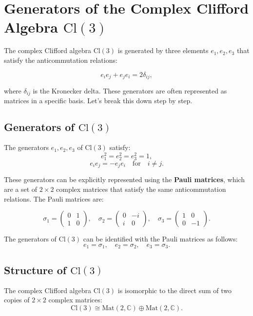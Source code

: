 \documentclass{article}
\begin{document}
\section*{Generators of the Complex Clifford Algebra \( \text{Cl}(3) \)}

The complex Clifford algebra \( \text{Cl}(3) \) is generated by three elements \( e_1, e_2, e_3 \) that satisfy the anticommutation relations:

\[
e_i e_j + e_j e_i = 2 \delta_{ij},
\]

where \( \delta_{ij} \) is the Kronecker delta. These generators are often represented as matrices in a specific basis. Let's break this down step by step.

\subsection*{Generators of \( \text{Cl}(3) \)}
The generators \( e_1, e_2, e_3 \) of \( \text{Cl}(3) \) satisfy:
\[
e_1^2 = e_2^2 = e_3^2 = 1,
\]
\[
e_i e_j = -e_j e_i \quad \text{for} \quad i \neq j.
\]

These generators can be explicitly represented using the \textbf{Pauli matrices}, which are a set of \( 2 \times 2 \) complex matrices that satisfy the same anticommutation relations. The Pauli matrices are:

\[
\sigma_1 = \begin{pmatrix} 0 & 1 \\ 1 & 0 \end{pmatrix}, \quad
\sigma_2 = \begin{pmatrix} 0 & -i \\ i & 0 \end{pmatrix}, \quad
\sigma_3 = \begin{pmatrix} 1 & 0 \\ 0 & -1 \end{pmatrix}.
\]

The generators of \( \text{Cl}(3) \) can be identified with the Pauli matrices as follows:
\[
e_1 = \sigma_1, \quad e_2 = \sigma_2, \quad e_3 = \sigma_3.
\]

\subsection*{Structure of \( \text{Cl}(3) \)}
The complex Clifford algebra \( \text{Cl}(3) \) is isomorphic to the direct sum of two copies of \( 2 \times 2 \) complex matrices:
\[
\text{Cl}(3) \cong \text{Mat}(2, \mathbb{C}) \oplus \text{Mat}(2, \mathbb{C}).
\]
\end{document}
